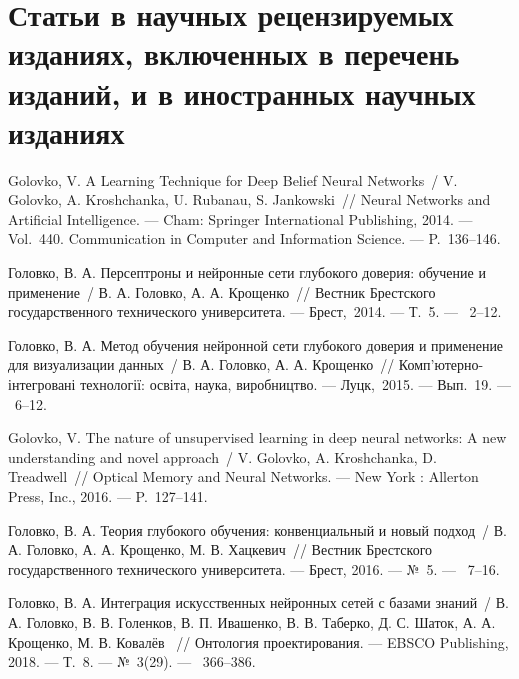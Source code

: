\ifx\isabstract\undefined 
\section* {Статьи в научных рецензируемых изданиях, включенных в перечень изданий, и в иностранных научных изданиях}
\fi

Golovko, V. A Learning Technique for Deep Belief Neural Networks~/ V. Golovko, A. Kroshchanka, U. Rubanau, S. Jankowski~//
Neural Networks and Artificial Intelligence. ---
\newblock Cham: Springer International Publishing, 2014. ---
\newblock Vol.~440. Communication in Computer and Information Science. ---
\newblock P.~136--146.

Головко, В. А. Персептроны и нейронные сети глубокого доверия: обучение и применение~/ В. А. Головко, А. А. Крощенко~//
  Вестник Брестского государственного технического университета. ---
\newblock Брест,~2014. ---
\newblock Т.~5. ---
~2--12.

Головко, В. А. Метод обучения нейронной сети глубокого доверия и применение для визуализации данных~/ В. А. Головко, А. А. Крощенко~//
  Комп'ютерно-інтегровані технології: освіта, наука, виробництво. ---
\newblock Луцк,~2015. ---
\newblock Вып.~19. ---
~6--12.

Golovko, V. The nature of unsupervised learning in deep neural networks: A new understanding and novel approach~/ V. Golovko, A. Kroshchanka, D. Treadwell~//
  Optical Memory and Neural Networks. ---
\newblock New York : Allerton Press, Inc., 2016. ---
\newblock P.~127--141.

Головко, В. А. Теория глубокого обучения: конвенциальный и новый подход~/ В. А. Головко, А. А. Крощенко, М. В. Хацкевич~//
  Вестник Брестского государственного технического университета. ---
\newblock Брест, 2016. ---
\newblock №~5. ---
~7--16.

Головко, В. А. Интеграция искусственных нейронных сетей с базами знаний~/ В. А. Головко, В. В. Голенков, В. П. Ивашенко, В. В. Таберко, Д. С. Шаток, А. А. Крощенко, М. В. Ковалёв ~//
  Онтология проектирования. ---
\newblock EBSCO Publishing, 2018. ---
\newblock Т.~8. ---
\newblock №~3(29). ---
~366--386.

